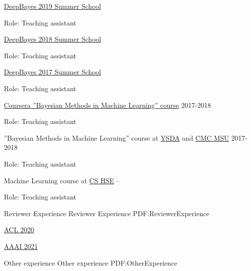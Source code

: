 \documentclass[letterpaper,MMMyyyy,nonstopmode]{simpleresumecv}
\begin{document}
\begin{Body}
\BulletItem
\href{http://deepbayes.ru}{DeepBayes 2019 Summer School}
\hfill
{}
\begin{Detail}
\Item
Role: Teaching assistant
\end{Detail}

\BulletItem
\href{http://deepbayes.ru/2018/}{DeepBayes 2018 Summer School}
\hfill
{}
\begin{Detail}
\Item
Role: Teaching assistant
\end{Detail}

\BulletItem
\href{http://deepbayes.ru/2017/}{DeepBayes 2017 Summer School}
\hfill
{}
\begin{Detail}
\Item
Role: Teaching assistant
\end{Detail}

\Gap

\BulletItem
\href{https://www.coursera.org/learn/bayesian-methods-in-machine-learning}
{Coursera ”Bayesian Methods in Machine Learning” course}
\hfill
2017-2018
\begin{Detail}
\Item
Role: Teaching assistant
\end{Detail}

\Gap

\BulletItem
”Bayesian Methods in Machine Learning” course at \href{https://yandexdataschool.com}{YSDA}
and \href{https://cs.msu.ru/en}{CMC MSU}
\hfill
2017-2018
\begin{Detail}
\Item
Role: Teaching assistant
\end{Detail}

\Gap

\BulletItem
Machine Learning course at \href{https://cs.hse.ru/en/}{CS HSE}
\hfill
{} --
\begin{Detail}
\Item
Role: Teaching assistant
\end{Detail}


\Section
{Reviewer Experience}
{Reviewer Experience}
{PDF:ReviewerExperience}

\BulletItem
\href{https://acl2020.org}{ACL 2020}

\BulletItem
\href{https://aaai.org/Conferences/AAAI-21/}{AAAI 2021}



\Section
{Other experience}
{Other experience}
{PDF:OtherExperience}


\end{Body}
\end{document}
